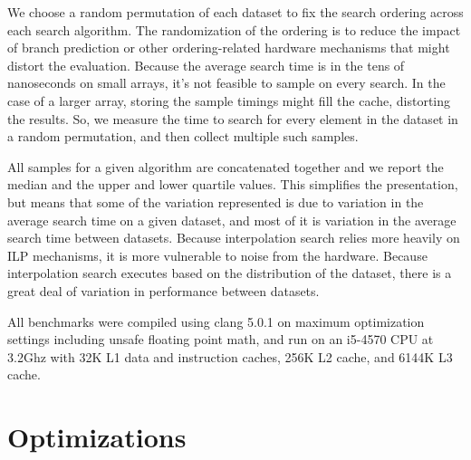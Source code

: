 \documentclass[twocolumn]{article}
\begin{document}
We choose a random permutation of each dataset to fix the search ordering across each search algorithm. The randomization of the ordering is to reduce the impact of branch prediction or other ordering-related hardware mechanisms that might distort the evaluation. Because the average search time is in the tens of nanoseconds on small arrays, it's not feasible to sample on every search. In the case of a larger array, storing the sample timings might fill the cache, distorting the results. So, we measure the time to search for every element in the dataset in a random permutation, and then collect multiple such samples.

All samples for a given algorithm are concatenated together and we report the median and the upper and lower quartile values. This simplifies the presentation, but means that some of the variation represented is due to variation in the average search time on a given dataset, and most of it is variation in the average search time between datasets. Because interpolation search relies more heavily on ILP mechanisms, it is more vulnerable to noise from the hardware. Because interpolation search executes based on the distribution of the dataset, there is a great deal of variation in performance between datasets.

All benchmarks were compiled using clang 5.0.1 on maximum optimization settings including unsafe floating point math, and run on an i5-4570 CPU at 3.2Ghz with 32K L1 data and instruction caches, 256K L2 cache, and 6144K L3 cache. 


\section{Optimizations}

\begin{figure}[t]
\end{figure} \label{b-lr}
\end{document}
